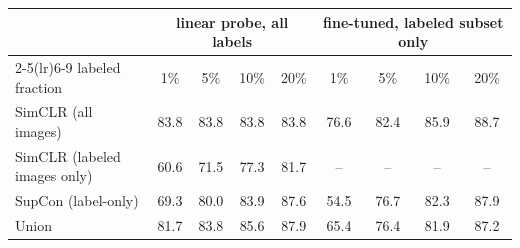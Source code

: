 \begin{tabular}{l cccc cccc}
\toprule
 & \multicolumn{4}{c}{linear probe, all labels} & \multicolumn{4}{c}{fine-tuned, labeled subset only} \\
\cmidrule(lr){2-5}\cmidrule(lr){6-9}
labeled fraction & 1\% & 5\% & 10\% & 20\% & 1\% & 5\% & 10\% & 20\% \\
\midrule
SimCLR (all images) & 83.8 & 83.8 & 83.8 & 83.8 & 76.6 & 82.4 & 85.9 & 88.7 \\
SimCLR (labeled images only) & 60.6 & 71.5 & 77.3 & 81.7 & -- & -- & -- & -- \\
SupCon (label-only) & 69.3 & 80.0 & 83.9 & 87.6 & 54.5 & 76.7 & 82.3 & 87.9 \\
Union & 81.7 & 83.8 & 85.6 & 87.9 & 65.4 & 76.4 & 81.9 & 87.2 \\
\bottomrule
\end{tabular}
